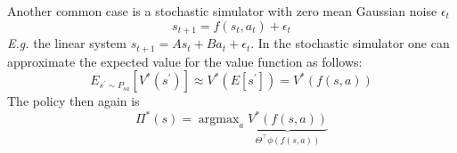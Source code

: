 \documentclass{article}
\begin{document}
Another common case is a stochastic simulator with zero mean Gaussian noise $\epsilon_t$
\begin{equation}
  s_{t+1}=f(s_t,a_t)+\epsilon_t
\end{equation}
\emph{E.g.} the linear system $s_{t+1}=As_t+Ba_t+\epsilon_t$.
In the stochastic simulator one can approximate the expected value for the value function as follows:
\begin{equation}
  E_{s^\prime\sim P_{sa}}[V^\ast(s^\prime)]\approx V^\ast(E[s^\prime])=V^\ast(f(s,a))
\end{equation}
The policy then again is
\begin{equation}
  \Pi^\ast(s)=\mathop{\operatorname{argmax}}_a\underbrace{V^\ast(f(s,a))}_{\Theta^\top\phi(f(s,a))}
\end{equation}
\end{document}
